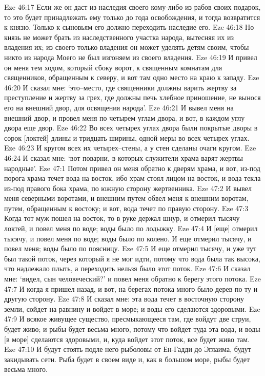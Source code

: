 Eze 46:17  Если же он даст из наследия своего кому-либо из рабов своих подарок, то это будет принадлежать ему только до года освобождения, и тогда возвратится к князю. Только к сыновьям его должно переходить наследие его.
Eze 46:18  Но князь не может брать из наследственного участка народа, вытесняя их из владения их; из своего только владения он может уделять детям своим, чтобы никто из народа Моего не был изгоняем из своего владения.
Eze 46:19  И привел он меня тем ходом, который сбоку ворот, к священным комнатам для священников, обращенным к северу, и вот там одно место на краю к западу.
Eze 46:20  И сказал мне: `это--место, где священники должны варить жертву за преступление и жертву за грех, где должны печь хлебное приношение, не вынося его на внешний двор, для освящения народа'.
Eze 46:21  И вывел меня на внешний двор, и провел меня по четырем углам двора, и вот, в каждом углу двора еще двор.
Eze 46:22  Во всех четырех углах двора были покрытые дворы в сорок [локтей] длины и тридцать ширины, одной меры во всех четырех углах.
Eze 46:23  И кругом всех их четырех--стены, а у стен сделаны очаги кругом.
Eze 46:24  И сказал мне: `вот поварни, в которых служители храма варят жертвы народные'.
Eze 47:1  Потом привел он меня обратно к дверям храма, и вот, из-под порога храма течет вода на восток, ибо храм стоял лицом на восток, и вода текла из-под правого бока храма, по южную сторону жертвенника.
Eze 47:2  И вывел меня северными воротами, и внешним путем обвел меня к внешним воротам, путем, обращенным к востоку; и вот, вода течет по правую сторону.
Eze 47:3  Когда тот муж пошел на восток, то в руке держал шнур, и отмерил тысячу локтей, и повел меня по воде; воды было по лодыжку.
Eze 47:4  И [еще] отмерил тысячу, и повел меня по воде; воды было по колено. И еще отмерил тысячу, и повел меня; воды было по поясницу.
Eze 47:5  И еще отмерил тысячу, и уже тут был такой поток, через который я не мог идти, потому что вода была так высока, что надлежало плыть, а переходить нельзя было этот поток.
Eze 47:6  И сказал мне: `видел, сын человеческий?' и повел меня обратно к берегу этого потока.
Eze 47:7  И когда я пришел назад, и вот, на берегах потока много было дерев по ту и другую сторону.
Eze 47:8  И сказал мне: эта вода течет в восточную сторону земли, сойдет на равнину и войдет в море; и воды его сделаются здоровыми.
Eze 47:9  И всякое живущее существо, пресмыкающееся там, где войдут две струи, будет живо; и рыбы будет весьма много, потому что войдет туда эта вода, и воды [в море] сделаются здоровыми, и, куда войдет этот поток, все будет живо там.
Eze 47:10  И будут стоять подле него рыболовы от Ен-Гадди до Эглаима, будут закидывать сети. Рыба будет в своем виде и, как в большом море, рыбы будет весьма много.
